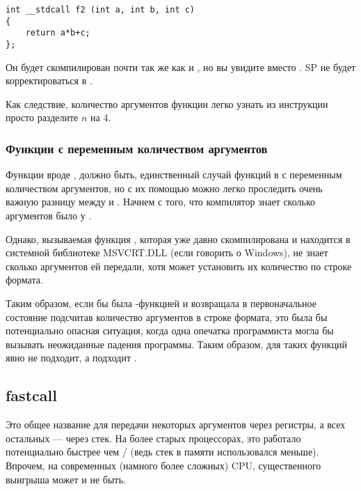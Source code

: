 \begin{lstlisting}[style=customc]
int __stdcall f2 (int a, int b, int c)
{
	return a*b+c;
};
\end{lstlisting}

Он будет скомпилирован почти так же как и ,
но вы увидите  вместо . 
\ac{SP} не будет корректироваться в .

Как следствие, количество аргументов функции легко узнать из инструкции  просто разделите
$n$ на 4.



\subsubsection{Функции с переменным количеством аргументов}

Функции вроде \printf, должно быть, единственный случай функций в \CCpp с переменным количеством аргументов,
но с их помощью можно легко проследить очень важную разницу между  и .
Начнем с того, что компилятор знает сколько аргументов было у \printf.

Однако, вызываемая функция \printf, которая уже давно скомпилирована 
и находится в системной библиотеке MSVCRT.DLL (если говорить о Windows), 
не знает сколько аргументов ей передали, хотя может установить их количество по строке формата.

Таким образом, если бы \printf была -функцией и возвращала  в первоначальное состояние 
подсчитав количество аргументов в строке формата, это была бы потенциально опасная ситуация, 
когда одна опечатка программиста могла бы вызывать неожиданные падения программы. 
Таким образом, для таких функций  явно не подходит, а подходит .

\subsection{fastcall}
\label{fastcall}

Это общее название для передачи некоторых аргументов через регистры, а всех остальных --- через стек.
На более старых процессорах, это работало потенциально быстрее чем / (ведь стек в памяти использовался меньше).
Впрочем, на современных (намного более сложных) CPU, существенного выигрыша может и не быть.

